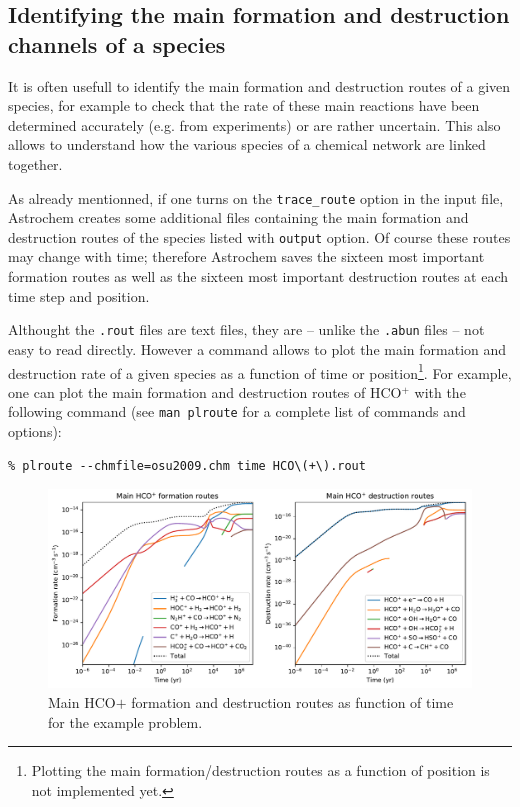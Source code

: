 \documentclass[a4paper,12pt]{article}
\begin{document}
\subsection{Identifying the main formation and destruction channels of
   a species}
\label{sec:ident-main-form}

It is often usefull to identify the main formation and destruction
routes of a given species, for example to check that the rate of these
main reactions have been determined accurately (e.g. from experiments)
or are rather uncertain. This also allows to understand how the
various species of a chemical network are linked together.

As already mentionned, if one turns on the \verb=trace_route= option
in the input file, Astrochem creates some additional files containing
the main formation and destruction routes of the species listed with
\verb=output= option. Of course these routes may change with time;
therefore Astrochem saves the sixteen most important formation routes
as well as the sixteen most important destruction routes at each time
step and position.

Althought the \verb=.rout= files are text files, they are -- unlike
the \verb=.abun= files -- not easy to read directly. However a command
allows to plot the main formation and destruction rate of a given
species as a function of time or position\footnote{Plotting the main
  formation/destruction routes as a function of position is not
  implemented yet.}. For example, one can plot the main formation and
destruction routes of HCO$^{+}$ with the following command (see
\verb=man plroute= for a complete list of commands and options):

\begin{verbatim}
% plroute --chmfile=osu2009.chm time HCO\(+\).rout
\end{verbatim}

\begin{figure}
  \begin{center}
    \includegraphics[width=\columnwidth]{fig2.pdf}
  \end{center}
  \caption{Main HCO${+}$ formation and destruction routes as function
    of time for the example problem.}
  \label{fig:example-routes}
\end{figure}
\end{document}
